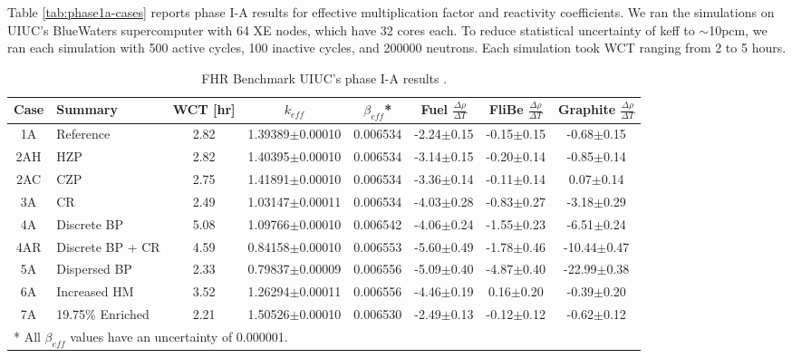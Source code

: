 Table \ref{tab:phase1a-cases} reports phase I-A results for effective multiplication 
factor and reactivity coefficients. 
We ran the simulations on \gls{UIUC}'s BlueWaters supercomputer \cite{ncsa_about_2017}
with 64 XE nodes, which have 32 cores each. 
To reduce statistical uncertainty of keff to $\sim$10pcm, we ran each simulation 
with 500 active cycles, 100 inactive cycles, and 200000 neutrons. 
Each simulation took \gls{WCT} ranging from 2 to 5 hours. 
\begin{table}[H]
    \centering
    \onehalfspacing
    \caption{\gls{FHR} Benchmark UIUC's phase I-A results \cite{chee_arfcfhr-benchmark_2021}.}
	\label{tab:phase1a-results}
    \footnotesize
    \begin{tabular}{cp{2.7cm}cccccc}
    \hline
    \textbf{Case} & \textbf{Summary} & \textbf{WCT [hr]} & \textbf{$k_{eff}$} & 
    \textbf{$\beta_{eff}$}* & 
    \textbf{Fuel} $\frac{\Delta \rho}{\Delta T}$ & 
    \textbf{FliBe} $\frac{\Delta \rho}{\Delta T}$ & 
    \textbf{Graphite} $\frac{\Delta \rho}{\Delta T}$\\
    \hline 
    1A & Reference &2.82&1.39389$\pm$0.00010 & 0.006534 & -2.24$\pm$0.15 & -0.15$\pm$0.15 & -0.68$\pm$0.15\\
    2AH & \gls{HZP} &2.82&1.40395$\pm$0.00010 & 0.006534 & -3.14$\pm$0.15 & -0.20$\pm$0.14 & -0.85$\pm$0.14\\
    2AC & \gls{CZP} &2.75&1.41891$\pm$0.00010 & 0.006534 & -3.36$\pm$0.14 & -0.11$\pm$0.14 & 0.07$\pm$0.14\\
    3A & \gls{CR} &2.49&1.03147$\pm$0.00011 & 0.006534 & -4.03$\pm$0.28 & -0.83$\pm$0.27 & -3.18$\pm$0.29\\
    4A & Discrete \gls{BP} &5.08&1.09766$\pm$0.00010 & 0.006542 & -4.06$\pm$0.24 & -1.55$\pm$0.23 & -6.51$\pm$0.24\\
    4AR & Discrete \gls{BP} + \gls{CR} &4.59&0.84158$\pm$0.00010 & 0.006553 & -5.60$\pm$0.49 & -1.78$\pm$0.46 & -10.44$\pm$0.47\\
    5A & Dispersed \gls{BP} &2.33&0.79837$\pm$0.00009 & 0.006556 & -5.09$\pm$0.40 & -4.87$\pm$0.40 & -22.99$\pm$0.38\\
    6A & Increased \gls{HM} &3.52&1.26294$\pm$0.00011 & 0.006556 & -4.46$\pm$0.19 & 0.16$\pm$0.20 & -0.39$\pm$0.20\\
    7A & 19.75\% Enriched &2.21&1.50526$\pm$0.00010 & 0.006530 & -2.49$\pm$0.13 & -0.12$\pm$0.12 & -0.62$\pm$0.12\\
    \hline
    \multicolumn{5}{l}{* All $\beta_{eff}$ values have an uncertainty of 0.000001.} 
    \end{tabular}
\end{table}


